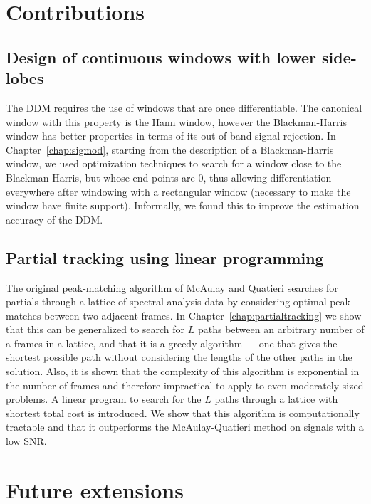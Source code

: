 \section{Contributions}

\subsection{Design of continuous windows with lower side-lobes}

The DDM requires the use of windows that are once differentiable. The canonical
window with this property is the Hann window, however the Blackman-Harris window
has better properties in terms of its out-of-band signal rejection. In
Chapter~\ref{chap:sigmod}, starting
from the description of a Blackman-Harris window, we used optimization
techniques to search for a window close to the Blackman-Harris, but whose
end-points are 0, thus allowing differentiation everywhere after windowing with
a rectangular window (necessary to make the window have finite support).
Informally, we found this to improve the estimation accuracy of the DDM.

\subsection{Partial tracking using linear programming}

The original peak-matching algorithm of McAulay and Quatieri
\cite{mcaulay1986speech} searches for partials through a lattice of spectral
analysis data by considering optimal peak-matches between two adjacent frames.
In Chapter~\ref{chap:partialtracking} we show that this can be generalized to
search for $L$ paths between an arbitrary number of a frames in a lattice, and
that it is a greedy algorithm --- one that gives the shortest possible path
without considering the lengths of the other paths in the solution. Also, it is
shown that the complexity of this algorithm is exponential in the number of
frames and therefore impractical to apply to even moderately sized problems. A
linear program to search for the $L$ paths through a lattice with shortest total
cost is introduced. We show that this algorithm is computationally tractable and
that it outperforms the McAulay-Quatieri method on signals with a low SNR.

\section{Future extensions}

